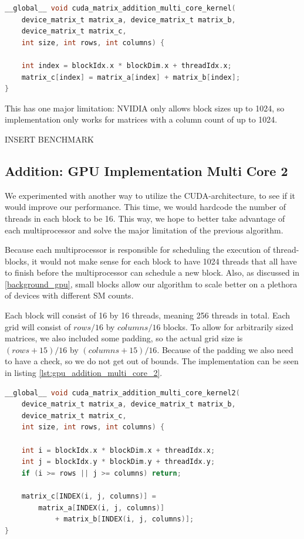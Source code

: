 \begin{lstlisting}[language=C, caption={GPU addition multi core}, label={lst:gpu_addition_multi_core}]
__global__ void cuda_matrix_addition_multi_core_kernel(
    device_matrix_t matrix_a, device_matrix_t matrix_b, 
    device_matrix_t matrix_c, 
    int size, int rows, int columns) {
    
    int index = blockIdx.x * blockDim.x + threadIdx.x;
    matrix_c[index] = matrix_a[index] + matrix_b[index];
}
\end{lstlisting}

This has one major limitation: NVIDIA only allows block sizes up to 1024, so implementation only works for matrices with a column count of up to 1024.

INSERT BENCHMARK

\subsection{Addition: GPU Implementation Multi Core 2}
We experimented with another way to utilize the CUDA-architecture, to see if it would improve our performance. This time, we would hardcode the number of threads in each block to be 16. This way, we hope to better take advantage of each multiprocessor and solve the major limitation of the previous algorithm.

Because each multiprocessor is responsible for scheduling the execution of thread-blocks, it would not make sense for each block to have 1024 threads that all have to finish before the multiprocessor can schedule a new block. Also, as discussed in \ref{background_gpu}, small blocks allow our algorithm to scale better on a plethora of devices with different SM counts.

Each block will consist of 16 by 16 threads, meaning 256 threads in total. Each grid will consist of $rows / 16$ by $columns / 16$ blocks. To allow for arbitrarily sized matrices, we also included some padding, so the actual grid size is $(rows + 15) / 16$ by $(columns + 15) / 16$. Because of the padding we also need to have a check, so we do not get out of bounds. The implementation can be seen in listing \ref{lst:gpu_addition_multi_core_2}.

\begin{lstlisting}[language=C, caption={GPU addition multi core 2}, label={lst:gpu_addition_multi_core_2}]
__global__ void cuda_matrix_addition_multi_core_kernel2(
    device_matrix_t matrix_a, device_matrix_t matrix_b,
    device_matrix_t matrix_c, 
    int size, int rows, int columns) {
    
    int i = blockIdx.x * blockDim.x + threadIdx.x;
    int j = blockIdx.y * blockDim.y + threadIdx.y;
    if (i >= rows || j >= columns) return;

    matrix_c[INDEX(i, j, columns)] =
        matrix_a[INDEX(i, j, columns)] 
            + matrix_b[INDEX(i, j, columns)];
}
\end{lstlisting}

